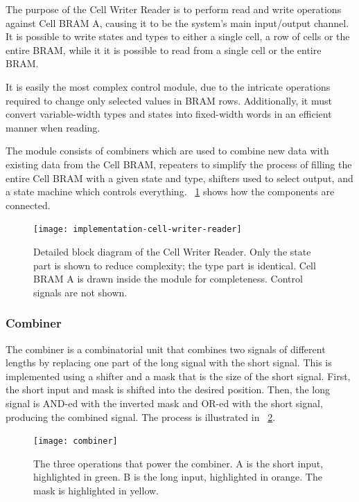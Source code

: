 The purpose of the Cell Writer Reader is to perform read and write operations against Cell BRAM A, causing it to be the system's main input/output channel.
It is possible to write states and types to either a single cell, a row of cells or the entire BRAM, while it it is possible to read from a single cell or the entire BRAM.

It is easily the most complex control module, due to the intricate operations required to change only selected values in BRAM rows.
Additionally, it must convert variable-width types and states into fixed-width words in an efficient manner when reading.

The module consists of combiners which are used to combine new data with existing data from the Cell BRAM, repeaters to simplify the process of filling the entire Cell BRAM with a given state and type, shifters used to select output, and a state machine which controls everything.
\figurename~\ref{fig:implementation-cell-writer-reader} shows how the components are connected.

\begin{figure}[!ht]
    \hspace{-0.02\textwidth}
    \texttt{[image: implementation-cell-writer-reader]}
    \caption[Cell Writer Reader]{
        Detailed block diagram of the Cell Writer Reader.
        Only the state part is shown to reduce complexity; the type part is identical.
        Cell BRAM A is drawn inside the module for completeness.
        Control signals are not shown.
    }
    \label{fig:implementation-cell-writer-reader}
\end{figure}

\subsubsection{Combiner}

The combiner is a combinatorial unit that combines two signals of different lengths by replacing one part of the long signal with the short signal.
This is implemented using a shifter and a mask that is the size of the short signal.
First, the short input and mask is shifted into the desired position.
Then, the long signal is AND-ed with the inverted mask and OR-ed with the short signal, producing the combined signal.
The process is illustrated in \figurename~\ref{fig:combiner}.

\begin{figure}[!ht]
    \centering
    \texttt{[image: combiner]}
    \caption[Combiner operation]{
        The three operations that power the combiner.
        A is the short input, highlighted in green.
        B is the long input, highlighted in orange.
        The mask is highlighted in yellow.
    }
    \label{fig:combiner}
\end{figure}

